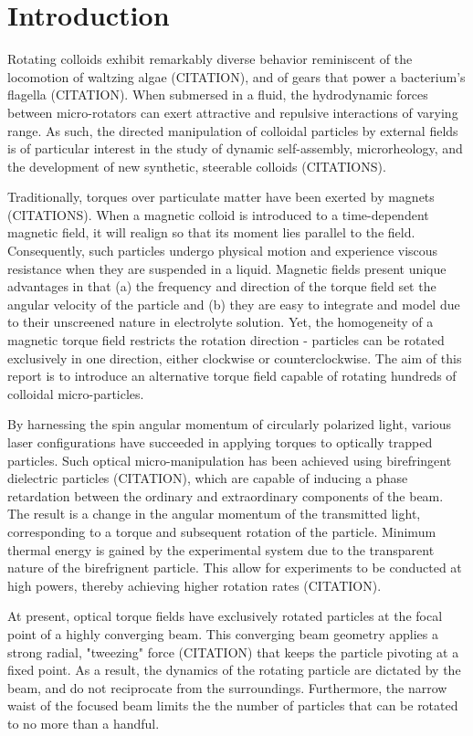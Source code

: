 \section*{Introduction}
Rotating colloids exhibit remarkably diverse behavior reminiscent of the locomotion of waltzing algae (CITATION), and of gears that power a bacterium’s flagella (CITATION). When submersed in a fluid, the hydrodynamic forces between micro-rotators can exert attractive and repulsive interactions of varying range. As such, the directed manipulation of colloidal particles by external fields is of particular interest in the study of dynamic self-assembly, microrheology, and the development of new synthetic, steerable colloids (CITATIONS). 

Traditionally, torques over particulate matter have been exerted by magnets (CITATIONS). When a magnetic colloid is introduced to a time-dependent magnetic field, it will realign so that its moment lies parallel to the field. Consequently, such particles undergo physical motion and experience viscous resistance when they are suspended in a liquid. Magnetic fields present unique advantages in that (a) the frequency and direction of the torque field set the angular velocity of the particle and (b) they are easy to integrate and model due to their unscreened nature in electrolyte solution. Yet, the homogeneity of a magnetic torque field restricts the rotation direction - particles can be rotated exclusively in one direction, either clockwise or counterclockwise.  The aim of this report is to introduce an alternative torque field capable of rotating hundreds of colloidal micro-particles.

By harnessing the spin angular momentum of circularly polarized light, various laser configurations have succeeded in applying torques to optically trapped particles. Such optical micro-manipulation has been achieved using birefringent dielectric particles (CITATION), which are capable of inducing a phase retardation between the ordinary and extraordinary components of the beam. The result is a change in the angular momentum of the transmitted light, corresponding to a torque and subsequent rotation of the particle. Minimum thermal energy is gained by the experimental system due to the transparent nature of the birefrignent particle. This allow for experiments to be conducted at high powers, thereby achieving higher rotation rates (CITATION).

At present, optical torque fields have exclusively rotated particles at the focal point of a highly converging beam. This converging beam geometry applies a strong radial, "tweezing" force (CITATION) that keeps the particle pivoting at a fixed point. As a result, the dynamics of the rotating particle are dictated by the beam, and do not reciprocate from the surroundings. Furthermore, the narrow waist of the focused beam limits the the number of particles that can be rotated to no more than a handful. 

